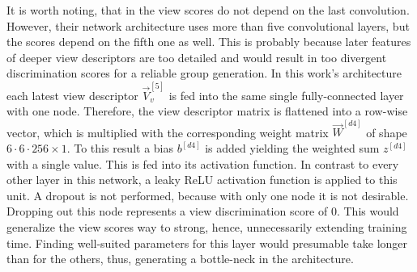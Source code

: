 It is worth noting, that in \cite{Feng2018} the view scores do not depend on the last convolution.
However, their network architecture uses more than five convolutional layers, but the scores depend on the fifth one as well.
This is probably because later features of deeper view descriptors are too detailed and would result in too divergent discrimination scores for a reliable group generation.
In this work's architecture each latest view descriptor $\vec{V}^{[5]}_v$ is fed into the same single fully-connected layer with one node.
Therefore, the view descriptor matrix is flattened into a row-wise vector, which is multiplied with the corresponding weight matrix $\vec{W}^{[d4]}$ of shape $6 \cdot 6 \cdot 256 \times 1$.
To this result a bias $b^{[d4]}$ is added yielding the weighted sum $z^{[d4]}$ with a single value.
This is fed into its activation function.
In contrast to every other layer in this network, a leaky ReLU activation function is applied to this unit.
A dropout is not performed, because with only one node it is not desirable.
Dropping out this node represents a view discrimination score of 0.
This would generalize the view scores way to strong, hence, unnecessarily extending training time.
Finding well-suited parameters for this layer would presumable take longer than for the others, thus, generating a bottle-neck in the architecture.

